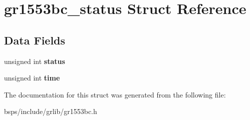 \hypertarget{structgr1553bc__status}{}\section{gr1553bc\+\_\+status Struct Reference}
\label{structgr1553bc__status}
\subsection*{Data Fields}
\begin{DoxyCompactItemize}
\item 
\mbox{\label{structgr1553bc__status_a83a5595026bcaace10da9d182c4a2fcc}} 
unsigned int {\bfseries status}
\item 
\mbox{\label{structgr1553bc__status_a36e478d3e2f20fd4e2b46aaa09f02577}} 
unsigned int {\bfseries time}
\end{DoxyCompactItemize}


The documentation for this struct was generated from the following file\+:\begin{DoxyCompactItemize}
\item 
bsps/include/grlib/gr1553bc.\+h\end{DoxyCompactItemize}
